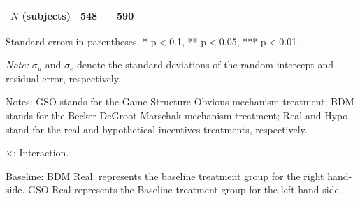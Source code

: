 \documentclass[12pt]{article}
\begin{document}
\begin{table}[H]
{\begin{tabular}{l*{2}{cc}}
\(N\) (subjects)       &       548       &            &       590        &            \\
\hline \hline

\end{tabular}
}


\begin{tablenotes}
            \footnotesize
            \item Standard errors in parentheses. * p$<$0.1, ** p$<$0.05, *** p$<$0.01.
            \item \textit{Note:} $\sigma_u$ and $\sigma_e$ denote the standard deviations of the random intercept and residual error, respectively.
            \item Notes: GSO stands for the Game Structure Obvious mechanism treatment; BDM stands for the Becker-DeGroot-Marschak mechanism treatment; Real and Hypo stand for the real and hypothetical incentives treatments, respectively.
           \item $\times$: Interaction.
           \item Baseline: BDM Real. represents the baseline treatment group for the right hand-side. 
           GSO Real represents the Baseline treatment group for the left-hand side.
        \end{tablenotes}
\end{table}
\clearpage






\begin{table}[htbp!]
    \centering
    \caption{Game form recognition}
    \label{tab:Appendix_gameform}
\end{table}

\clearpage
\end{document}
